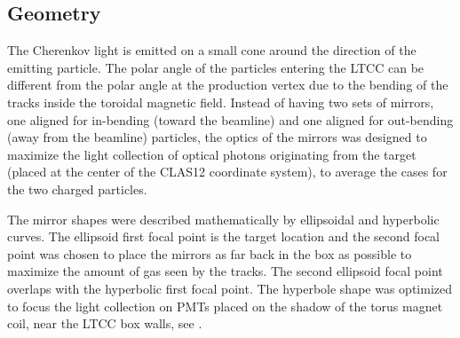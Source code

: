 \subsection{Geometry}

The Cherenkov light is emitted on a small cone around the direction of the emitting particle. The polar angle of
the particles entering the LTCC can be different from the polar angle at the production vertex due
to the bending of the tracks inside the toroidal magnetic field.
Instead of having two sets of mirrors, one aligned for in-bending (toward the beamline) and one aligned for
out-bending (away from the beamline) particles, the optics of the mirrors was designed to maximize the
light collection of optical photons originating from the target (placed at the center of the CLAS12 coordinate system),
to average the cases for the two charged particles.

The mirror shapes were described mathematically by ellipsoidal and hyperbolic curves.
The ellipsoid first focal point is the target location and the second focal point was chosen
to place the mirrors as far back in the box as possible to maximize the amount of gas seen by the tracks.
The second ellipsoid focal point overlaps with the hyperbolic first focal point. The hyperbole shape was optimized to focus the light
collection on PMTs placed on the shadow of the torus magnet coil, near the LTCC box walls, see .


